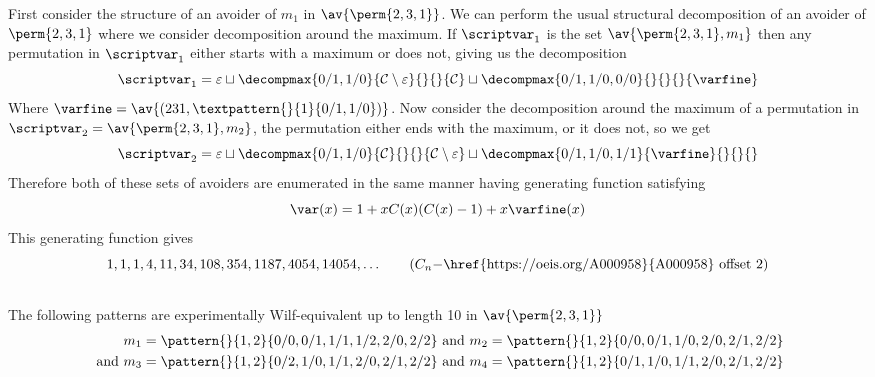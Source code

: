 First consider the structure of an avoider of \(m_1\) in \(\av{\perm{2,3,1}}\).
We can perform the usual structural decomposition of an avoider
of \(\perm{2,3,1}\) where we consider decomposition around the maximum.
If \(\scriptvar_1\) is the set \(\av{\perm{2,3,1},m_1}\) then any permutation in
\(\scriptvar_1\) either starts with a maximum or does not, giving us the
decomposition
\begin{equation*}
    \scriptvar_1 = \varepsilon \sqcup
    \decompmax{0/1,1/0}{\mathcal{C}\setminus\varepsilon}{}{}{\mathcal{C}} \sqcup
    \decompmax{0/1,1/0,0/0}{}{}{}{\mathcal{\varfine}}
\end{equation*}
Where \(\mathcal{\varfine} = \av{(231,\textpattern{}{1}{0/1,1/0})}\).
Now consider the decomposition around the maximum of a permutation in
\(\scriptvar_2 = \av{\perm{2,3,1},m_2}\), the permutation either ends with
the maximum, or it does not, so we get
\begin{equation*}
    \scriptvar_2 = \varepsilon \sqcup
    \decompmax{0/1,1/0}{\mathcal{C}}{}{}{\mathcal{C}\setminus\varepsilon} \sqcup
    \decompmax{0/1,1/0,1/1}{\mathcal{\varfine}}{}{}{}
\end{equation*}
Therefore both of these sets of avoiders are enumerated in the same manner
having generating function satisfying
\begin{equation*}
    \var(x) = 1 + xC(x)(C(x)-1) + x\varfine(x)
\end{equation*}
This generating function gives
\begin{equation*}
    1, 1, 1, 4, 11, 34, 108, 354, 1187, 4054, 14054,\dotsc \tag{\(C_n - \)\href{https://oeis.org/A000958}{A000958} offset 2}
\end{equation*}


\subsection{}
\nextvar
The following patterns are experimentally Wilf-equivalent up to length 10 in
\(\av{\perm{2,3,1}}\)
\begin{equation*}
    \begin{aligned}
        m_1 = \pattern{}{1,2}{0/0,0/1,1/1,1/2,2/0,2/2} &\text{ and }
        m_2 = \pattern{}{1,2}{0/0,0/1,1/0,2/0,2/1,2/2} \\
        \text{ and }
        m_3 = \pattern{}{1,2}{0/2,1/0,1/1,2/0,2/1,2/2} &\text{ and }
        m_4 = \pattern{}{1,2}{0/1,1/0,1/1,2/0,2/1,2/2}
    \end{aligned}
\end{equation*}


